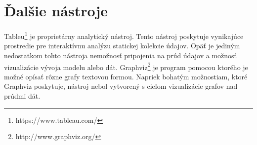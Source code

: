 
\section{Ďalšie nástroje}
Tableu\footnote{https://www.tableau.com/} je proprietárny analytický nástroj. Tento nástroj poskytuje vynikajúce prostredie pre interaktívnu analýzu statickej kolekcie údajov. Opäť je jediným nedostatkom tohto nástroja nemožnosť pripojenia na prúd údajov a možnosť vizualizácie vývoja modelu alebo dát. Graphviz\footnote{http://www.graphviz.org/} je program pomocou ktorého je možné opísať rôzne grafy textovou formou. Napriek bohatým možnostiam, ktoré Graphviz poskytuje, nástroj nebol vytvorený s cieľom vizualizácie grafov nad prúdmi dát.














